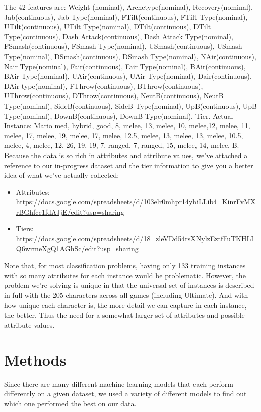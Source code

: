\documentclass{article}
\begin{document}
The 42 features are: 
Weight (nominal), Archetype(nominal), Recovery(nominal), Jab(continuous), Jab Type(nominal), FTilt(continuous), FTilt Type(nominal), UTilt(continuous), UTilt Type(nominal), DTilt(continuous), DTilt Type(continuous), Dash Attack(continuous), Dash Attack Type(nominal), FSmash(continuous), FSmash Type(nominal), USmash(continuous), USmash Type(nominal), DSmash(continuous), DSmash Type(nominal), NAir(continuous), Nair Type(nominal), Fair(continuous), Fair Type(nominal), BAir(continuous), BAir Type(nominal), UAir(continuous), UAir Type(nominal), Dair(continuous), DAir type(nominal), FThrow(continuous), BThrow(continuous), UThrow(continuous), DThrow(continuous), NeutB(continuous), NeutB Type(nominal), SideB(continuous), SideB Type(nominal), UpB(continuous), UpB Type(nominal), DownB(continuous), DownB Type(nominal), Tier.    
\linebreak
Actual Instance: Mario
med, hybrid, good, 8, melee, 13, melee, 10, melee,12, melee, 11, melee, 17, melee, 19, melee, 17, melee, 12.5, melee, 13, melee, 13, melee, 10.5, melee,  4,  melee, 12, 26, 19, 19, 7, ranged, 7, ranged, 15, melee, 14, melee, B.
Because the data is so rich in attributes and attribute values, we’ve attached a reference to our in-progress dataset  and the tier information to give you a better idea of what we’ve actually collected:
\begin{itemize}
  \item Attributes: \url{https://docs.google.com/spreadsheets/d/103elr0mhpr14yhiLLib4\_KinrFvMXrBGhfcc1fdAJjE/edit?usp=sharing}
  \item Tiers: \url{https://docs.google.com/spreadsheets/d/18\_zleVDd54rsXNylzEztfFuTKHLIQ6wrmeXgQ1AGhSc/edit?usp=sharing}
\end{itemize}
Note that, for most classification problems, having only 133 training instances with so many attributes for each instance would be problematic. However, the problem we’re solving is unique in that the universal set of instances is described in full with the 205 characters across all games (including Ultimate). And with how unique each character is, the more detail we can capture in each instance, the better. Thus the need for a somewhat larger set of attributes and possible attribute values. 

\section{Methods}

Since there are many different machine learning models that each perform differently on a given dataset, we used a variety of different models to find out which one performed the best on our data.
\end{document}

